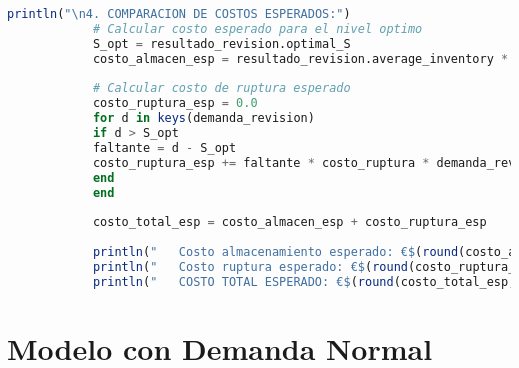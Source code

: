 \documentclass[12pt,a4paper]{book}
\begin{document}
\begin{tcolorbox}[enhanced,colback=azulclaro,colframe=azulprincipal,boxrule=2pt,arc=8pt,
		title={\bfseries\color{white} \faCode\ SOLUCI\'ON COMPLETA},breakable]
\begin{lstlisting}[language=Julia,basicstyle=\footnotesize\ttfamily]
			println("\n4. COMPARACION DE COSTOS ESPERADOS:")
			# Calcular costo esperado para el nivel optimo
			S_opt = resultado_revision.optimal_S
			costo_almacen_esp = resultado_revision.average_inventory * costo_almacenamiento
			
			# Calcular costo de ruptura esperado
			costo_ruptura_esp = 0.0
			for d in keys(demanda_revision)
			if d > S_opt
			faltante = d - S_opt
			costo_ruptura_esp += faltante * costo_ruptura * demanda_revision[d]
			end
			end
			
			costo_total_esp = costo_almacen_esp + costo_ruptura_esp
			
			println("   Costo almacenamiento esperado: €$(round(costo_almacen_esp,digits=2))")
			println("   Costo ruptura esperado: €$(round(costo_ruptura_esp,digits=2))")
			println("   COSTO TOTAL ESPERADO: €$(round(costo_total_esp,digits=2)) por periodo")
		\end{lstlisting}
		
	\end{tcolorbox}
	
	\section{Modelo con Demanda Normal}
	
\end{document}
